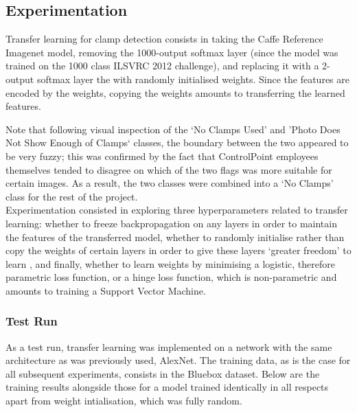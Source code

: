 \documentclass[a4paper,11pt]{article}
\begin{document}
\subsection{Experimentation}

Transfer learning for clamp detection consists in taking the Caffe Reference Imagenet model, removing the 1000-output softmax layer (since the model was trained on the 1000 class ILSVRC 2012 challenge), and replacing it with a 2-output softmax layer the with randomly initialised weights. Since the features are encoded by the weights, copying the weights amounts to transferring the learned features.

Note that following visual inspection of the `No Clamps Used' and 'Photo Does Not Show Enough of Clamps` classes, the boundary between the two appeared to be very fuzzy; this was confirmed by the fact that ControlPoint employees themselves tended to disagree on which of the two flags was more suitable for certain images. As a result, the two classes were combined into a `No Clamps' class for the rest of the project. \\

Experimentation consisted in exploring three hyperparameters related to transfer learning: whether to freeze backpropagation on any layers in order to maintain the features of the transferred model, whether to randomly initialise rather than copy the weights of certain layers in order to give these layers `greater freedom' to learn \cite{transfer-learning}, and finally, whether to learn weights by minimising a logistic, therefore parametric loss function, or a hinge loss function, which is non-parametric and amounts to training a Support Vector Machine. 


\subsubsection{Test Run}

As a test run, transfer learning was implemented on a network with the same architecture as was previously used, AlexNet. The training data, as is the case for all subsequent experiments, consists in the Bluebox dataset. Below are the training results alongside those for a model trained identically in all respects apart from weight intialisation, which was fully random. 
\end{document}
